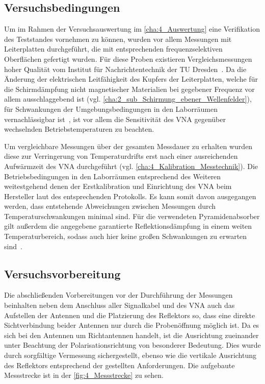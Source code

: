 

\subsection{Versuchsbedingungen}

Um im Rahmen der Versuchsauswertung im \Abschnitt\ref{cha:4_Auswertung} eine Verifikation des Teststandes vornehmen zu können, wurden vor allem Messungen mit Leiterplatten durchgeführt, die mit entsprechenden frequenzselektiven Oberflächen gefertigt wurden. Für diese Proben existieren Vergleichsmessungen hoher Qualität vom Institut für Nachrichtentechnik der TU Dresden~\cite{FSS_Toedter_Diplomarbeit}. Da die Änderung der elektrischen Leitfähigkeit des Kupfers der Leiterplatten, welche für die Schirmdämpfung nicht magnetischer Materialien bei gegebener Frequenz vor allem ausschlaggebend ist (vgl. \Abschnitt\ref{cha:2_sub_Schirmung_ebener_Wellenfelder}), für Schwankungen der Umgebungsbedingungen in den Laborräumen vernachlässigbar ist~\cite{Materialdaten_Kupfer}, ist vor allem die Sensitivität des VNA gegenüber wechselnden Betriebstemperaturen zu beachten.
\par
\vspace{\linespace}
Um vergleichbare Messungen über der gesamten Messdauer zu erhalten wurden diese zur Verringerung von Temperaturdrifts erst nach einer ausreichenden Aufwärmzeit des VNA durchgeführt (vgl. \Abschnitt\ref{cha:4_Kalibration_Messtechnik}). Die Betriebsbedingungen in den Laborräumen entsprechend des Weiteren weitestgehend denen der Erstkalibration und Einrichtung des VNA beim Hersteller laut des entsprechenden Protokolls. Es kann somit davon ausgegangen werden, dass entstehende Abweichungen zwischen Messungen durch Temperaturschwankungen minimal sind. Für die verwendeten Pyramidenabsorber gilt außerdem die angegebene garantierte Reflektionsdämpfung in einem weiten Temperaturbereich, sodass auch hier keine großen Schwankungen zu erwarten sind~\cite{Eco_Messtechnik_Absorber}.



\subsection{Versuchsvorbereitung}

Die abschließenden Vorbereitungen vor der Durchführung der Messungen beinhalten neben dem Anschluss aller Signalkabel und des VNA auch das Aufstellen der Antennen und die Platzierung des Reflektors so, dass eine direkte Sichtverbindung beider Antennen nur durch die Probenöffnung möglich ist. Da es sich bei den Antennen um Richtantennen handelt, ist die Ausrichtung zueinander unter Beachtung der Polarisationsrichtung von besonderer Bedeutung. Dies wurde durch sorgfältige Vermessung sichergestellt, ebenso wie die vertikale Ausrichtung des Reflektors entsprechend der gestellten Anforderungen. Die aufgebaute Messstrecke ist in der \Abb\ref{fig:4_Messstrecke} zu sehen.
\par
\vspace{\linespace}


